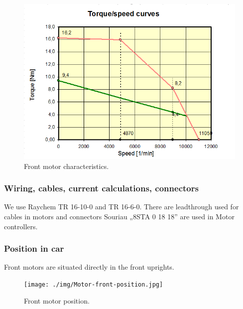 \begin{figure}[H]
	\centering
	\includegraphics[width=\textwidth]{./img/MOTOR2-torque.png}
	\caption{Front motor characteristics.}
	\label{fig:torque2}
\end{figure}


\subsubsection{Wiring, cables, current calculations, connectors}
We use Raychem TR 16-10-0 and TR 16-6-0. There are leadthrough used for cables in motors and connectors Souriau „8STA 0 18 18” are used in Motor controllers.

\subsubsection{Position in car}
Front motors are situated directly in the front uprights.

\begin{figure}[H]
	\centering
	\texttt{[image: ./img/Motor-front-position.jpg]}
	\caption{Front motor position.}
	\label{fig:Motor-front-position}
\end{figure}


